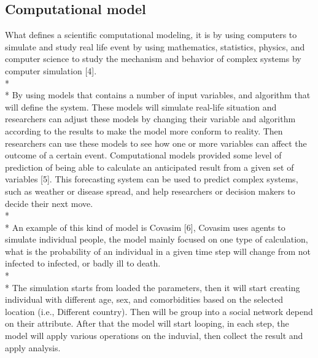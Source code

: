 \subsection{Computational model}
What defines a scientific computational modeling, it is by using computers to simulate and study real life event by using mathematics, statistics, physics, and computer science to study the mechanism and behavior of complex systems by computer simulation [4]. \\*\\*
By using models that contains a number of input variables, and algorithm that will define the system. These models will simulate real-life situation and researchers can adjust these models by changing their variable and algorithm according to the results to make the model more conform to reality. Then researchers can use these models to see how one or more variables can affect the outcome of a certain event. Computational models provided some level of prediction of being able to calculate an anticipated result from a given set of variables [5]. This forecasting system can be used to predict complex systems, such as weather or disease spread, and help researchers or decision makers to decide their next move.\\*\\*
An example of this kind of model is Covasim [6], Covasim uses agents to simulate individual people, the model mainly focused on one type of calculation, what is the probability of an individual in a given time step will change from not infected to infected, or badly ill to death. \\*\\*
The simulation starts from loaded the parameters, then it will start creating individual with different age, sex, and comorbidities based on the selected location (i.e., Different country). Then will be group into a social network depend on their attribute. After that the model will start looping, in each step, the model will apply various operations on the induvial, then collect the result and apply analysis.

